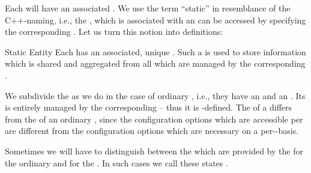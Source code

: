 \documentclass[a4paper, 12pt]{book}
\begin{document}
Each  will have an associated . We use the term ``static'' in resemblance of the C++-naming, i.e.,
the , which is associated with an  can be accessed by specifying the corresponding
. Let us turn this notion into definitions:

\begin{definition*}{Static Entity}
  Each  has an associated, unique . Such a  is used to store information which is
  shared and aggregated from all  which are managed by the
  corresponding .
\end{definition*}
We subdivide the  as we do in the case of ordinary
, i.e., they have an  and an
. Its  is entirely managed by
the corresponding  -- thus it is
-defined. The  of a 
differs from the  of an ordinary , since
the configuration options which are accessible per  are
different from the configuration options which are necessary on a
per--basis.

Sometimes we will have to distinguish between the
 which are provided by the
 for the ordinary  and for
the . In such cases we call these states
.

\end{document}
